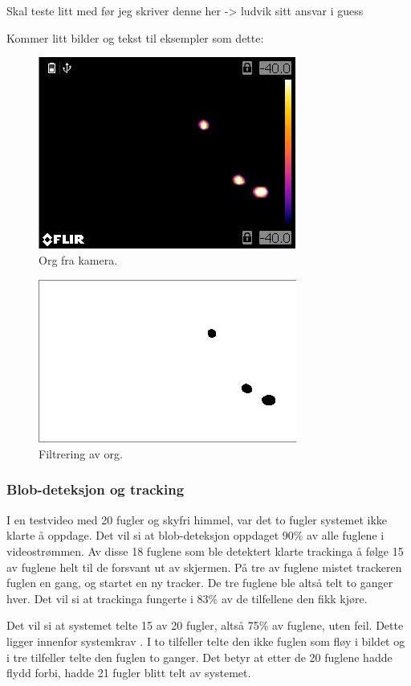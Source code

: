 Skal teste litt med før jeg skriver denne her -> ludvik sitt ansvar i guess

Kommer litt bilder og tekst til eksempler som dette:

\begin{figure}[H]
    \centering
    \includegraphics[width=.5\textwidth]{verifikasjon-test/Tracking_ex/org1.JPG}
    \caption{Org fra kamera.}
    \label{fig:verifikasjon:filtrering:1}
\end{figure}
\begin{figure}[H]
    \centering
    \includegraphics[width=.5\textwidth]{verifikasjon-test/Tracking_ex/filt1.JPG}
    \caption{Filtrering av org.}
    \label{fig:verifikasjon:filtrering:2}
\end{figure}

\subsubsection{Blob-deteksjon og tracking}\label{sec:verifikasjon:programvare:blob-detection_og_tracking}
I en testvideo med 20 fugler og skyfri himmel, var det to fugler systemet ikke klarte å oppdage. Det vil si at blob-deteksjon oppdaget 90\% av alle fuglene i videostrømmen. Av disse 18 fuglene som ble detektert klarte trackinga å følge 15 av fuglene helt til de forsvant ut av skjermen. På tre av fuglene mistet trackeren fuglen en gang, og startet en ny tracker. De tre fuglene ble altså telt to ganger hver. Det vil si at trackinga fungerte i 83\% av de tilfellene den fikk kjøre.

Det vil si at systemet telte 15 av 20 fugler, altså 75\% av fuglene, uten feil. Dette ligger innenfor systemkrav . I to tilfeller telte den ikke fuglen som fløy i bildet og i tre tilfeller telte den fuglen to ganger. Det betyr at etter de 20 fuglene hadde flydd forbi, hadde 21 fugler blitt telt av systemet.


